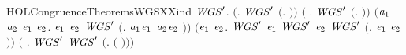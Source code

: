 \begin{SaveVerbatim}{HOLCongruenceTheoremsWGSXXind}
\HOLTokenTurnstile{} \HOLSymConst{\HOLTokenForall{}}\ensuremath{\HOLBoundVar{WGS}\sp{\prime}}.
       \ensuremath{(}\HOLSymConst{\HOLTokenForall{}}. \ensuremath{\HOLBoundVar{WGS}\sp{\prime}} \ensuremath{(}\HOLTokenLambda{}. \ensuremath{)}\ensuremath{)} \HOLSymConst{\HOLTokenConj{}}
       \ensuremath{(}\HOLSymConst{\HOLTokenForall{}} .   \HOLSymConst{\HOLTokenImp{}} \ensuremath{\HOLBoundVar{WGS}\sp{\prime}} \ensuremath{(}\HOLTokenLambda{}. \HOLSymConst{\ensuremath{\ldotp}} \ensuremath{)}\ensuremath{)} \HOLSymConst{\HOLTokenConj{}}
       \ensuremath{(}\HOLSymConst{\HOLTokenForall{}}\ensuremath{\HOLBoundVar{a}\sb{\mathrm{1}}} \ensuremath{\HOLBoundVar{a}\sb{\mathrm{2}}} \ensuremath{\HOLBoundVar{e}\sb{\mathrm{1}}} \ensuremath{\HOLBoundVar{e}\sb{\mathrm{2}}}.
             \ensuremath{\HOLBoundVar{e}\sb{\mathrm{1}}} \HOLSymConst{\HOLTokenConj{}}  \ensuremath{\HOLBoundVar{e}\sb{\mathrm{2}}} \HOLSymConst{\HOLTokenImp{}}
            \ensuremath{\HOLBoundVar{WGS}\sp{\prime}} \ensuremath{(}\HOLTokenLambda{}. \ensuremath{\HOLBoundVar{a}\sb{\mathrm{1}}}\HOLSymConst{\ensuremath{\ldotp}}\ensuremath{\HOLBoundVar{e}\sb{\mathrm{1}}}  \HOLSymConst{\ensuremath{+}} \ensuremath{\HOLBoundVar{a}\sb{\mathrm{2}}}\HOLSymConst{\ensuremath{\ldotp}}\ensuremath{\HOLBoundVar{e}\sb{\mathrm{2}}} \ensuremath{)}\ensuremath{)} \HOLSymConst{\HOLTokenConj{}}
       \ensuremath{(}\HOLSymConst{\HOLTokenForall{}}\ensuremath{\HOLBoundVar{e}\sb{\mathrm{1}}} \ensuremath{\HOLBoundVar{e}\sb{\mathrm{2}}}. \ensuremath{\HOLBoundVar{WGS}\sp{\prime}} \ensuremath{\HOLBoundVar{e}\sb{\mathrm{1}}} \HOLSymConst{\HOLTokenConj{}} \ensuremath{\HOLBoundVar{WGS}\sp{\prime}} \ensuremath{\HOLBoundVar{e}\sb{\mathrm{2}}} \HOLSymConst{\HOLTokenImp{}} \ensuremath{\HOLBoundVar{WGS}\sp{\prime}} \ensuremath{(}\HOLTokenLambda{}. \ensuremath{\HOLBoundVar{e}\sb{\mathrm{1}}}  \HOLSymConst{\ensuremath{\mid}} \ensuremath{\HOLBoundVar{e}\sb{\mathrm{2}}} \ensuremath{)}\ensuremath{)} \HOLSymConst{\HOLTokenConj{}}
       \ensuremath{(}\HOLSymConst{\HOLTokenForall{}} . \ensuremath{\HOLBoundVar{WGS}\sp{\prime}}  \HOLSymConst{\HOLTokenImp{}} \ensuremath{\HOLBoundVar{WGS}\sp{\prime}} \ensuremath{(}\HOLTokenLambda{}.   \ensuremath{(} \ensuremath{)}\ensuremath{)}\ensuremath{)} \HOLSymConst{\HOLTokenConj{}}

\end{SaveVerbatim}
